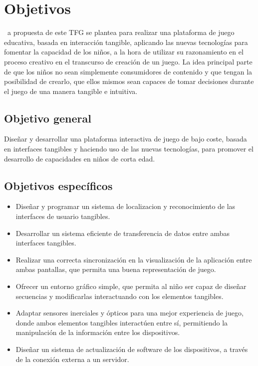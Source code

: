 \chapter{Objetivos}
\label{chap:objetivos}

\noindent
{}~a propuesta de este TFG se plantea para realizar una plataforma de juego educativa, basada en interacción tangible, aplicando las nuevas tecnologías para fomentar la capacidad de los niños, a la hora de utilizar su razonamiento en el proceso creativo en el transcurso de creación de un juego. La idea principal parte de que los niños no sean simplemente consumidores de contenido y que tengan la posibilidad de crearlo, que ellos mismos sean capaces de tomar decisiones durante el juego de una manera tangible e intuitiva. 


\section{Objetivo general}

Diseñar y desarrollar una plataforma interactiva de juego de bajo coste, basada en interfaces tangibles y haciendo uso de las nuevas tecnologías, para promover el desarrollo de capacidades en niños de corta edad.

\section{Objetivos específicos}

\begin{itemize}
\item Diseñar y programar un sistema de localizacion y reconocimiento de las interfaces de usuario tangibles.

\item Desarrollar un sistema eficiente de transferencia de datos entre ambas interfaces tangibles.

\item Realizar una correcta sincronización en la visualización de la aplicación entre ambas pantallas, que permita una buena representación de juego.

\item Ofrecer un entorno gráfico simple, que permita al niño ser capaz de diseñar secuencias y modificarlas interactuando con los elementos tangibles.

\item Adaptar sensores inerciales y ópticos para una mejor experiencia de juego, donde ambos elementos tangibles interactúen entre sí, permitiendo la manipulación de la información entre los dispositivos.

\item Diseñar un sistema de actualización de software de los dispositivos, a través de la conexión externa a un servidor.
\end{itemize}



